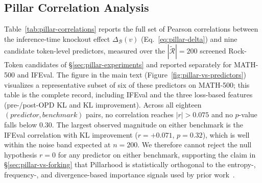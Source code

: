 \subsection{Pillar Correlation Analysis}
\label{app:pillar_correlations}

Table~\ref{tab:pillar-correlations} reports the full set of Pearson correlations between the inference-time knockout effect $\Delta_{\mathcal{B}}(v)$ (Eq.~\ref{eq:pillar-delta}) and nine candidate token-level predictors, measured over the $|\widetilde{\mathcal{R}}|=200$ screened Rock-Token candidates of \S\ref{sec:pillar-experiments} and reported separately for MATH-500 and IFEval. The figure in the main text (Figure~\ref{fig:pillar-vs-predictors}) visualizes a representative subset of six of these predictors on MATH-500; this table is the complete record, including IFEval and the three loss-based features (pre-/post-OPD KL and KL improvement). Across all eighteen $(predictor, benchmark)$ pairs, no correlation reaches $|r| > 0.075$ and no $p$-value falls below $0.30$. The largest observed magnitude on either benchmark is the IFEval correlation with KL improvement ($r{=}+0.071$, $p{=}0.32$), which is well within the noise band expected at $n{=}200$. We therefore cannot reject the null hypothesis $r=0$ for any predictor on either benchmark, supporting the claim in \S\ref{sec:pillar-vs-forking} that Pillarhood is statistically orthogonal to the entropy-, frequency-, and divergence-based importance signals used by prior work~\cite{wangbeyond,tip2026,yang2025token,wu2025mitigating}.

